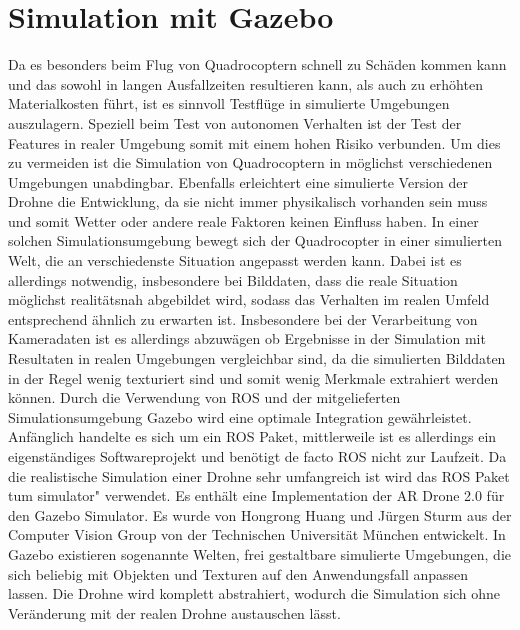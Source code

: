 \section{Simulation mit Gazebo} %
Da es besonders beim Flug von Quadrocoptern schnell zu Schäden kommen kann und das sowohl  in langen Ausfallzeiten resultieren kann, als auch zu erhöhten Materialkosten führt, ist es sinnvoll Testflüge in simulierte Umgebungen auszulagern. Speziell beim Test von autonomen Verhalten ist der Test der Features in realer Umgebung somit mit einem hohen Risiko verbunden. Um dies zu vermeiden ist die Simulation von Quadrocoptern in möglichst verschiedenen Umgebungen unabdingbar. Ebenfalls erleichtert eine simulierte Version der Drohne die Entwicklung, da sie nicht immer physikalisch vorhanden sein muss und somit Wetter oder andere reale Faktoren keinen Einfluss haben. In einer solchen Simulationsumgebung bewegt sich der Quadrocopter in einer simulierten Welt, die an verschiedenste Situation angepasst werden kann. Dabei ist es allerdings notwendig, insbesondere
bei Bilddaten, dass die reale Situation möglichst realitätsnah abgebildet wird, sodass
das Verhalten im realen Umfeld entsprechend ähnlich zu erwarten ist. Insbesondere bei der
Verarbeitung von Kameradaten ist es allerdings abzuwägen ob Ergebnisse in der Simulation
mit Resultaten in realen Umgebungen vergleichbar sind, da die simulierten
Bilddaten in der Regel wenig texturiert sind und somit wenig Merkmale extrahiert werden können.\newline
Durch die Verwendung von ROS und der mitgelieferten Simulationsumgebung Gazebo wird eine optimale Integration gewährleistet. Anfänglich handelte es sich um ein ROS Paket, mittlerweile ist es allerdings
ein eigenständiges Softwareprojekt und benötigt de facto ROS nicht zur Laufzeit.
\newline
Da die realistische Simulation einer Drohne sehr umfangreich ist wird das ROS Paket \grqq tum simulator" verwendet. Es enthält eine Implementation der AR Drone 2.0 für den Gazebo Simulator. Es wurde von Hongrong Huang und Jürgen Sturm aus der Computer Vision Group von der Technischen Universität München entwickelt.\cite{tumsim}  In Gazebo existieren sogenannte Welten, frei gestaltbare simulierte Umgebungen, die sich beliebig mit Objekten und Texturen auf den Anwendungsfall anpassen lassen. Die Drohne wird komplett abstrahiert, wodurch die Simulation sich ohne Veränderung mit der realen Drohne austauschen lässt. \newline
